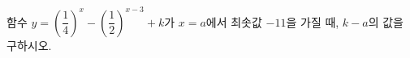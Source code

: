 함수 $y=\left(\dfrac{1}{4}\right)^{x}-\left(\dfrac{1}{2}\right)^{x-3}+k$가 $x=a$에서 최솟값 $-11$을 가질 때, $k-a$의 값을 구하시오. 
